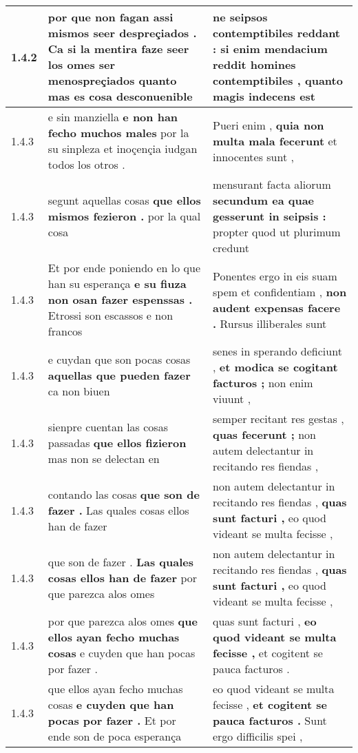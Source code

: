 \begin{tabular}{|p{1cm}|p{6.5cm}|p{6.5cm}|}
1.4.2 & por que non fagan assi mismos seer despreçiados . \textbf{ Ca si la mentira faze seer los omes ser menospreçiados } quanto mas es cosa desconuenible & ne seipsos contemptibiles reddant : \textbf{ si enim mendacium reddit homines contemptibiles , } quanto magis indecens est \\\hline
1.4.3 & e sin manziella \textbf{ e non han fecho muchos males } por la su sinpleza et inoçençia iudgan todos los otros . & Pueri enim , \textbf{ quia non multa mala fecerunt } et innocentes sunt , \\\hline
1.4.3 & segunt aquellas cosas \textbf{ que ellos mismos fezieron . } por la qual cosa & mensurant facta aliorum \textbf{ secundum ea quae gesserunt in seipsis : } propter quod ut plurimum credunt \\\hline
1.4.3 & Et por ende poniendo en lo que han su esperança \textbf{ e su fiuza non osan fazer espenssas . } Etrossi son escassos e non francos & Ponentes ergo in eis suam spem et confidentiam , \textbf{ non audent expensas facere . } Rursus illiberales sunt \\\hline
1.4.3 & e cuydan que son pocas cosas \textbf{ aquellas que pueden fazer } ca non biuen & senes in sperando deficiunt , \textbf{ et modica se cogitant facturos ; } non enim viuunt , \\\hline
1.4.3 & sienpre cuentan las cosas passadas \textbf{ que ellos fizieron } mas non se delectan en & semper recitant res gestas , \textbf{ quas fecerunt ; } non autem delectantur in recitando res fiendas , \\\hline
1.4.3 & contando las cosas \textbf{ que son de fazer . } Las quales cosas ellos han de fazer & non autem delectantur in recitando res fiendas , \textbf{ quas sunt facturi , } eo quod videant se multa fecisse , \\\hline
1.4.3 & que son de fazer . \textbf{ Las quales cosas ellos han de fazer } por que parezca alos omes & non autem delectantur in recitando res fiendas , \textbf{ quas sunt facturi , } eo quod videant se multa fecisse , \\\hline
1.4.3 & por que parezca alos omes \textbf{ que ellos ayan fecho muchas cosas } e cuyden que han pocas por fazer . & quas sunt facturi , \textbf{ eo quod videant se multa fecisse , } et cogitent se pauca facturos . \\\hline
1.4.3 & que ellos ayan fecho muchas cosas \textbf{ e cuyden que han pocas por fazer . } Et por ende son de poca esperança & eo quod videant se multa fecisse , \textbf{ et cogitent se pauca facturos . } Sunt ergo difficilis spei , \\\hline

\end{tabular}
